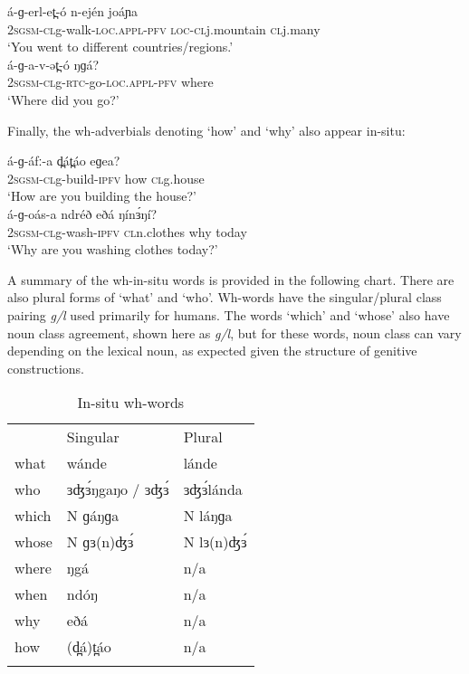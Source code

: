 \ea
\ea \gll		á-ɡ-erl-et̪-ó	n-ején	joáɲa\\
		2\textsc{sgsm-cl}g-walk-\textsc{loc}.\textsc{appl}-\textsc{pfv}	\textsc{loc-}\textsc{cl}j.mountain	\textsc{cl}j.many\\
\trans           		‘You went to different countries/regions.’	\\
\ex \gll	á-ɡ-a-v-ət̪-ó	ŋɡá?		     \\
		2\textsc{sgsm-cl}g-\textsc{rtc}-go-\textsc{loc}.\textsc{appl}-\textsc{pfv}	where\\
\trans		‘Where did you go?’	  \\
\z
\z

Finally, the wh-adverbials denoting ‘how’ and ‘why’ also appear in-situ: 

\ea
\ea \gll		á-ɡ-áfː-a	d̪át̪áo	eɡea?\\
	2\textsc{sgsm-cl}g-build-\textsc{ipfv}	how	\textsc{cl}g.house \\
\trans	‘How are you building the house?’\\
\ex \gll	á-ɡ-oás-a	ndréð	eðá	ŋínɜ́ŋí?\\
	2\textsc{sgsm-cl}g-wash-\textsc{ipfv}	\textsc{cl}n.clothes	why	today\\
\trans	‘Why are you washing clothes today?’\\
\z
\z

A summary of the wh-in-situ words is provided in the following chart. There are also plural forms of ‘what’ and ‘who’. Wh-words have the singular/plural class pairing \textit{g/l} used primarily for humans. The words ‘which’ and ‘whose’ also have noun class agreement, shown here as \textit{g/l}, but for these words, noun class can vary depending on the lexical noun, as expected given the structure of genitive constructions. 

\begin{table}
\caption{In-situ wh-words}
\label{Ch19:1}
	\begin{tabular}[t]{lll}
\lsptoprule
& Singular	&	Plural\\
what	&	wánde	&	lánde\\
who	&	ɜʤɜ́ŋgaŋo / ɜʤɜ́	&	ɜʤɜ́lánda\\
which	&	N  ɡáŋɡa	&	N láŋɡa\\
whose	&	N  ɡɜ(n)ʤɜ́	&	N lɜ(n)ʤɜ́\\
where	&	ŋgá	&	n/a\\
when	&	ndóŋ	&	n/a\\
why	&	eðá	&	n/a\\
how	&	(d̪á)t̪áo	&	n/a\\
\lspbottomrule
	\end{tabular}
\end{table}

